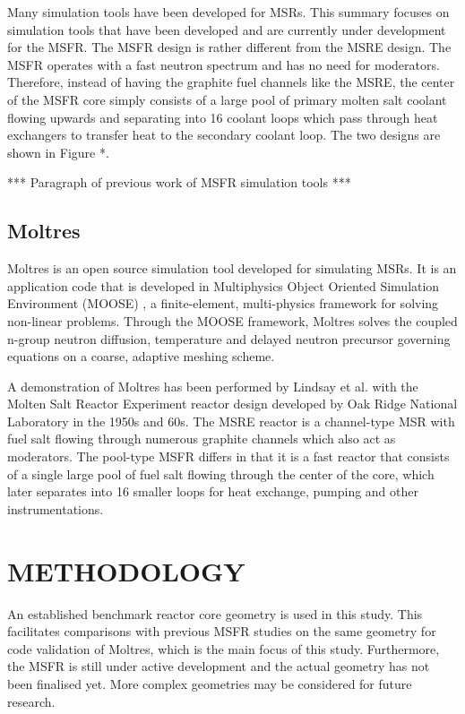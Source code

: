 \documentclass[letterpaper]{mandc2019}
\begin{document}
Many simulation tools have been developed for MSRs. This summary focuses on simulation tools that have been developed and are currently under development for the MSFR. The MSFR design is rather different from the MSRE design. The MSFR operates with a fast neutron spectrum and has no need for moderators. Therefore, instead of having the graphite fuel channels like the MSRE, the center of the MSFR core simply consists of a large pool of primary molten salt coolant flowing upwards and separating into 16 coolant loops which pass through heat exchangers to transfer heat to the secondary coolant loop. The two designs are shown in Figure *. 

*** Paragraph of previous work of MSFR simulation tools ***

\subsection{Moltres}

Moltres is an open source simulation tool developed for simulating MSRs. It is an application code that is developed in Multiphysics Object Oriented Simulation Environment (MOOSE) \cite{gaston_moose:_2009}, a finite-element, multi-physics framework for solving non-linear problems. Through the MOOSE framework, Moltres solves the coupled n-group neutron diffusion, temperature and delayed neutron precursor governing equations on a coarse, adaptive meshing scheme.

A demonstration of Moltres has been performed by Lindsay et al. \cite{lindsay_introduction_2018} with the Molten Salt Reactor Experiment reactor design developed by Oak Ridge National Laboratory in the 1950s and 60s. The MSRE reactor is a channel-type MSR with fuel salt flowing through numerous graphite channels which also act as moderators. The pool-type MSFR differs in that it is a fast reactor that consists of a single large pool of fuel salt flowing through the center of the core, which later separates into 16 smaller loops for heat exchange, pumping and other instrumentations. 

\section{METHODOLOGY}

An established benchmark reactor core geometry is used in this study. This facilitates comparisons with previous MSFR studies on the same geometry for code validation of Moltres, which is the main focus of this study. Furthermore, the MSFR is still under active development and the actual geometry has not been finalised yet. More complex geometries may be considered for future research.
\end{document}

